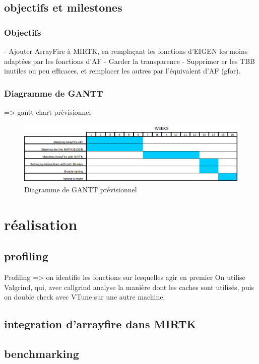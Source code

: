 \documentclass{report}
\begin{document}
	\section{objectifs et milestones}
	\subsection{Objectifs}- Ajouter ArrayFire à MIRTK, en remplaçant les fonctions d'EIGEN les moins adaptées par les fonctions d'AF
	- Garder la transparence
	- Supprimer er les TBB inutiles ou peu efficaces, et remplacer les autres par l'équivalent d'AF (gfor).
	\subsection{Diagramme de GANTT}
	 => gantt chart prévisionnel
	\begin{figure}[h!]
		\begin{center}
			\includegraphics[width=18cm]{Reports/figures/estimated_gantt.png}
		\end{center}	
		\caption{Diagramme de GANTT prévisionnel}
		\label{Diagramme de GANTT prévisionnel}
	\end{figure}
\chapter{ réalisation}
	\section{profiling}
	Profiling => on identifie les fonctions sur lesquelles agir en premier
	On utilise Valgrind, qui, avec callgrind analyse la manière dont les caches sont utilisés, puis on double check avec VTune sur une autre machine.
	\section{integration d'arrayfire dans MIRTK}
	\section{benchmarking}
	 
	
\end{document}

